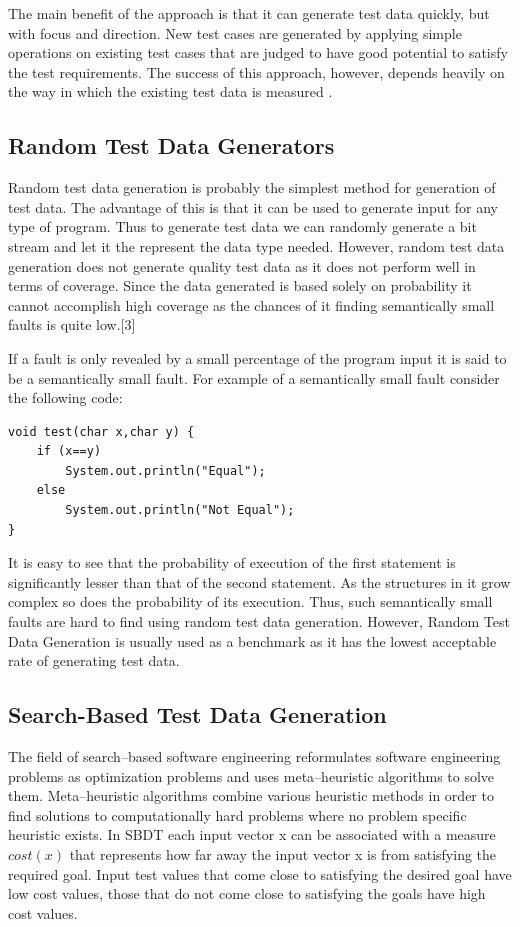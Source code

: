 The main benefit of the approach is that it can generate test data quickly, but with focus and direction. New test cases are generated by applying simple operations on existing test cases that are judged to have good potential to satisfy the test requirements. The success of this approach, however, depends heavily on the way in which the existing test data is measured \cite{pargas1999test}.


\subsection{Random Test Data Generators}

Random test data generation is probably the simplest method for generation of test data. The advantage of this is that it can be used to generate input for any type of program. Thus to generate test data we can randomly generate a bit stream and let it the represent the data type needed. However, random test data generation does not generate quality test data as it does not perform well in terms of coverage. Since the data generated is based solely on probability it cannot accomplish high coverage as the chances of it finding semantically small faults is quite low.[3]

If a fault is only revealed by a small percentage of the program input it is said to be a semantically small fault. For example of a semantically small fault consider the following code:
\begin{lstlisting}
void test(char x,char y) {
    if (x==y)
        System.out.println("Equal");
    else
        System.out.println("Not Equal");
}
\end{lstlisting}

It is easy to see that the probability of execution of the first statement is significantly lesser than that of the second statement. As the structures in it grow complex so does the probability of its execution. Thus, such semantically small faults are hard to find using random test data generation. However, Random Test Data Generation is usually used as a benchmark as it has the lowest acceptable rate of generating test data.

\subsection{Search-Based Test Data Generation}
The field of search–based software engineering reformulates software engineering problems as optimization problems and uses meta–heuristic algorithms to solve them. Meta–heuristic algorithms combine various heuristic methods in order to find solutions to computationally hard problems where no problem specific heuristic exists. In SBDT each input vector x can be associated with a measure $cost(x)$ that represents how far away the input vector x is from satisfying the required goal. Input test values that come close to satisfying the desired goal have low cost values, those that do not come close to satisfying the goals have high cost values. 

